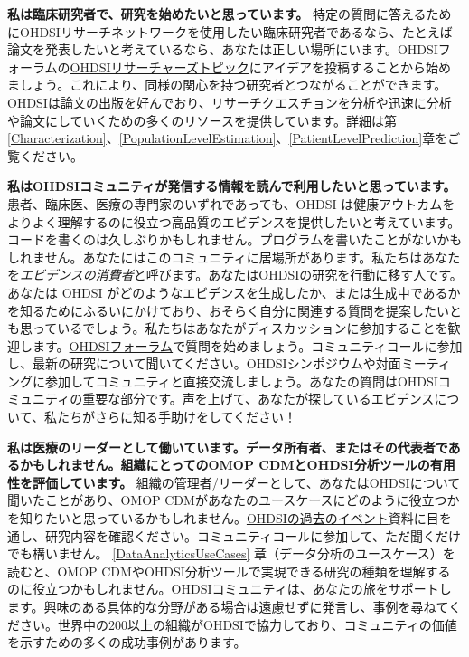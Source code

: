 \documentclass[
  11pt]{book}
\theoremstyle{definition}
\theoremstyle{definition}
\theoremstyle{definition}
\theoremstyle{definition}
\theoremstyle{remark}
\begin{document}
\textbf{私は臨床研究者で、研究を始めたいと思っています。} 特定の質問に答えるためにOHDSIリサーチネットワークを使用したい臨床研究者であるなら、たとえば論文を発表したいと考えているなら、あなたは正しい場所にいます。OHDSIフォーラムの\href{https://forums.ohdsi.org/c/researchers}{OHDSIリサーチャーズトピック}にアイデアを投稿することから始めましょう。これにより、同様の関心を持つ研究者とつながることができます。OHDSIは論文の出版を好んでおり、リサーチクエスチョンを分析や迅速に分析や論文にしていくための多くのリソースを提供しています。詳細は第\ref{Characterization}、\ref{PopulationLevelEstimation}、\ref{PatientLevelPrediction}章をご覧ください。

\textbf{私はOHDSIコミュニティが発信する情報を読んで利用したいと思っています。} 患者、臨床医、医療の専門家のいずれであっても、OHDSI は健康アウトカムをよりよく理解するのに役立つ高品質のエビデンスを提供したいと考えています。コードを書くのは久しぶりかもしれません。プログラムを書いたことがないかもしれません。あなたにはこのコミュニティに居場所があります。私たちはあなたを\emph{エビデンスの消費者}と呼びます。あなたはOHDSIの研究を行動に移す人です。あなたは OHDSI がどのようなエビデンスを生成したか、または生成中であるかを知るためにふるいにかけており、おそらく自分に関連する質問を提案したいとも思っているでしょう。私たちはあなたがディスカッションに参加することを歓迎します。\href{http://forums.ohdsi.org}{OHDSIフォーラム}で質問を始めましょう。コミュニティコールに参加し、最新の研究について聞いてください。OHDSIシンポジウムや対面ミーティングに参加してコミュニティと直接交流しましょう。あなたの質問はOHDSIコミュニティの重要な部分です。声を上げて、あなたが探しているエビデンスについて、私たちがさらに知る手助けをしてください！

\textbf{私は医療のリーダーとして働いています。データ所有者、またはその代表者であるかもしれません。組織にとってのOMOP CDMとOHDSI分析ツールの有用性を評価しています。} 組織の管理者/リーダーとして、あなたはOHDSIについて聞いたことがあり、OMOP CDMがあなたのユースケースにどのように役立つかを知りたいと思っているかもしれません。\href{https://www.ohdsi.org/past-events/}{OHDSIの過去のイベント}資料に目を通し、研究内容を確認ください。コミュニティコールに参加して、ただ聞くだけでも構いません。 \ref{DataAnalyticsUseCases} 章（データ分析のユースケース）を読むと、OMOP CDMやOHDSI分析ツールで実現できる研究の種類を理解するのに役立つかもしれません。OHDSIコミュニティは、あなたの旅をサポートします。興味のある具体的な分野がある場合は遠慮せずに発言し、事例を尋ねてください。世界中の200以上の組織がOHDSIで協力しており、コミュニティの価値を示すための多くの成功事例があります。
\end{document}
